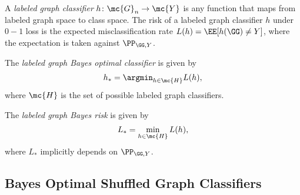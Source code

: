 \documentclass[10pt,journal,cspaper,compsoc]{IEEEtran}
\begin{document}

	A \emph{labeled graph classifier} $h\colon \mc{G}_n \to \mc{Y}$ is any function that maps from labeled graph space to class space. The risk of a labeled graph classifier $h$ under $0-1$ loss is the expected misclassification rate $L(h)=\EE[h(\GG)\neq Y]$, where the expectation is taken against $\PP_{\GG,Y}$.
	
	The \emph{labeled graph Bayes optimal classifier} is given by
	\begin{align}
		h_* = \argmin_{h \in \mc{H}} L(h),
	\end{align}
	where $\mc{H}$ is the set of possible labeled graph classifiers.
	
	The \emph{labeled graph Bayes risk} is given by 
	\begin{align}
		L_* =\min_{h \in \mc{H}} L(h),
	\end{align}
	where $L_*$ implicitly depends on $\PP_{\GG,Y}$.




\subsection{Bayes Optimal Shuffled Graph Classifiers} %
\end{document}
